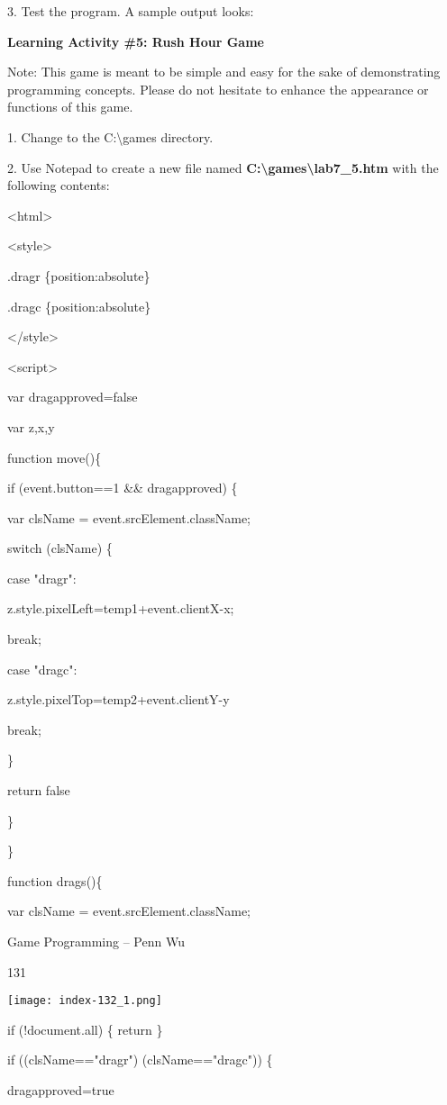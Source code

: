 \documentclass[
]{article}
\begin{document}
3. Test the program. A sample output looks:

\textbf{Learning Activity \#5: Rush Hour Game}

Note: This game is meant to be simple and easy for the sake of
demonstrating programming concepts. Please do not hesitate to enhance
the appearance or functions of this game.

1. Change to the C:\textbackslash games directory.

2. Use Notepad to create a new file named
\textbf{C:\textbackslash games\textbackslash lab7\_5.htm} with the
following contents:

\textless html\textgreater{}

\textless style\textgreater{}

.dragr \{position:absolute\}

.dragc \{position:absolute\}

\textless/style\textgreater{}

\textless script\textgreater{}

var dragapproved=false

var z,x,y

function move()\{

if (event.button==1 \&\& dragapproved) \{

var clsName = event.srcElement.className;

switch (clsName) \{

case "dragr":

z.style.pixelLeft=temp1+event.clientX-x;

break;

case "dragc":

z.style.pixelTop=temp2+event.clientY-y

break;

\}

return false

\}

\}

function drags()\{

var clsName = event.srcElement.className;

Game Programming -- Penn Wu

131

\protect\hypertarget{index_split_008.htmlux5cux23p132}{}{}\texttt{[image: index-132\_1.png]}

if (!document.all) \{ return \}

if ((clsName=="dragr") \textbar\textbar{} (clsName=="dragc")) \{

dragapproved=true
\end{document}
